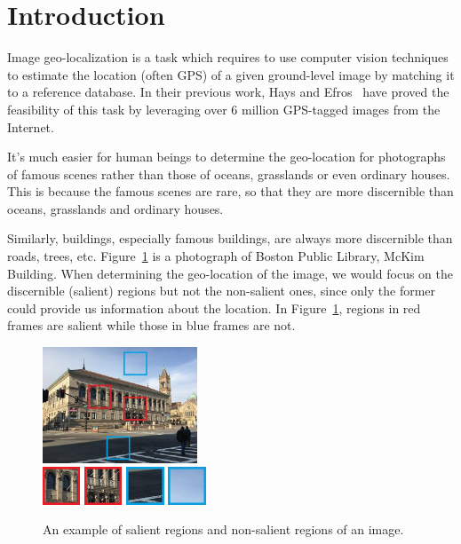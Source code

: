 \section{Introduction}
\par
Image geo-localization is a task which requires to use computer vision techniques to estimate the location (often GPS) of a given ground-level image by matching it to a reference database. In their previous work, Hays and Efros~\cite{hays2008im2gps} have proved the feasibility of this task by leveraging over 6 million GPS-tagged images from the Internet.
\par
It's much easier for human beings to determine the geo-location for photographs of famous scenes rather than those of oceans, grasslands or even ordinary houses. This is because the famous scenes are rare, so that they are more discernible than oceans, grasslands and ordinary houses.
\par 
Similarly, buildings, especially famous buildings, are always more discernible than roads, trees, etc.  Figure~\ref{fig:library} is a photograph of Boston Public Library, McKim Building. When determining the geo-location of the image, we would focus on the discernible (salient) regions but not the non-salient ones, since only the former could provide us information about the location. In Figure~\ref{fig:library}, regions in red frames are salient while those in blue frames are not.
\begin{figure}[htbp]
\includegraphics[width=0.41\textwidth]{img/library}
\\[0.1cm]
\includegraphics[width=0.1\textwidth]{img/library_1}
\includegraphics[width=0.1\textwidth]{img/library_2}
\includegraphics[width=0.1\textwidth]{img/library_3}
\includegraphics[width=0.1\textwidth]{img/library_4}
\caption{An example of salient regions and non-salient regions of an image.}
\label{fig:library}
\end{figure}
